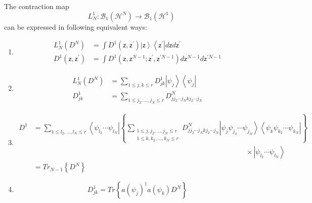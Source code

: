\documentclass[aps,preprint]{revtex4}%
\begin{document}
The contraction map
\begin{equation}
L_{N}^{1}:\mathcal{B}_{1}\left(  \mathcal{H}^{N}\right)  \rightarrow
\mathcal{B}_{1}\left(  \mathcal{H}^{1}\right)
\end{equation}
can be expressed in following equivalent ways:

\begin{enumerate}
\item
\begin{align}
L_{N}^{1}\left(  D^{N}\right)   &  =%
{\displaystyle\int}
D^{1}\left(  \mathsf{z,z}^{\prime}\right)  \left\vert \mathsf{z}\right\rangle
\left\langle \mathsf{z}^{\prime}\right\vert d\mathsf{z}d\mathsf{z}^{\prime
}\nonumber\\
D^{1}\left(  \mathsf{z,z}^{\prime}\right)   &  =%
{\displaystyle\int}
D^{1}\left(  \mathsf{z,z}^{N-1};\mathsf{z}^{\prime},\mathsf{z}^{\prime
N-1}\right)  d\mathsf{z}^{N-1}d\mathsf{z}^{\prime N-1}%
\end{align}


\item
\begin{align}
L_{N}^{1}\left(  D^{N}\right)   &  =%
{\displaystyle\sum\limits_{1\leq j,k\leq r}}
D_{jk}^{1}\left\vert \psi_{j}\right\rangle \left\langle \psi_{j}\right\vert
\nonumber\\
D_{jk}^{1}  &  =%
{\displaystyle\sum\limits_{1\leq j_{2},\ldots,j_{N}\leq r}}
D_{jj_{2}\cdots j_{N}kj_{2}\cdots j_{N}}^{N}%
\end{align}


\item
\begin{align}
D^{1}  &  =%
{\displaystyle\sum\limits_{1\leq l_{2},\ldots,l_{N}\leq r}}
\left\langle \psi_{l_{2}}\cdots\psi_{l_{N}}\right\vert \left\{
{\displaystyle\sum\limits_{\substack{1\leq j,j_{2},\ldots,j_{N}\leq r\\1\leq
k,k_{2},\ldots,k_{N}\leq r}}}
D_{jj_{2}\cdots j_{N}kj_{2}\cdots j_{N}}^{N}\left\vert \psi_{j}\psi_{j_{2}%
}\cdots\psi_{j_{N}}\right\rangle \left\langle \psi_{k}\psi_{k_{2}}\cdots
\psi_{k_{N}}\right\vert \right\} \nonumber\\
&  \qquad\qquad\qquad\qquad\qquad\qquad\qquad\qquad\qquad\qquad\qquad
\qquad\qquad\qquad\qquad\times\left\vert \psi_{l_{2}}\cdots\psi_{l_{N}%
}\right\rangle \nonumber\\
&  =Tr_{N-1}\left\{  D^{N}\right\}
\end{align}


\item
\begin{equation}
D_{jk}^{1}=Tr\left\{  a\left(  \psi_{j}\right)  ^{\dagger}a\left(  \psi
_{k}\right)  D^{N}\right\}
\end{equation}

\end{enumerate}
\end{document}
